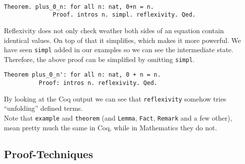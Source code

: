 	   \begin{example}
		   \begin{theorem} ~\\\vspace{-5mm}
	  	   {\normalfont \begin{lstlisting}[caption=\lstinline!plus_0_n!, label=lst:plus_0_n]
	   		Theorem. plus_0_n: for all n: nat, 0+n = n.
	   		  Proof. intros n. simpl. reflexivity. Qed.
	    	\end{lstlisting}}	
		\end{theorem}
		\end{example}              
	    \begin{remark}
	    	Reflexivity does not only check weather both sides of an equation contain identical values. 
	    	On top of that it simplifies, which makes it more powerful. 
	    	We have seen \lstinline!simpl! added in our examples so we can see the intermediate state.
	    	Therefore, the above proof can be simplified by omitting \lstinline!simpl!. 
	     \end{remark}	
	
		\begin{lstlisting}[caption={ \lstinline!plus_0_n'!}, label= lst:plus0nPrime]
	    Theorem plus_0_n': for all n: nat, 0 + n = n.
	      Proof: intros n. reflexivity. Qed.	
	    \end{lstlisting}    
	    By looking at the Coq output we can see that \lstinline!reflexivity! somehow tries ``unfolding'' defined terms.\\    
	    Note that \lstinline!example! and \lstinline!theorem! (and \lstinline!Lemma!, \lstinline!Fact!, \lstinline!Remark! and a few other),
	    mean pretty much the same in Coq, while in Mathematics they do not.
	    
	   
	\subsection{Proof-Techniques}
	\label{subsec:proof-techniques}
	    
